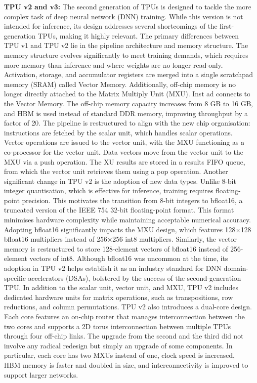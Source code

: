 \textbf{TPU v2 and v3:} The second generation of TPUs \cite{Norrie2021} is designed to tackle the more complex task of deep neural network (DNN) training. While this version is not intended for inference, its design addresses several shortcomings of the first-generation TPUs, making it highly relevant.
The primary differences between TPU v1 and TPU v2 lie in the pipeline architecture and memory structure. The memory structure evolves significantly to meet training demands, which requires more memory than inference and where weights are no longer read-only. Activation, storage, and accumulator registers are merged into a single scratchpad memory (SRAM) called Vector Memory. Additionally, off-chip memory is no longer directly attached to the Matrix Multiply Unit (MXU). Inst ad connects to the Vector Memory.
The off-chip memory capacity increases from 8 GB to 16 GB, and HBM is used instead of standard DDR memory, improving throughput by a factor of 20.
The pipeline is restructured to align with the new chip organisation: instructions are fetched by the scalar unit, which handles scalar operations. Vector operations are issued to the vector unit, with the MXU functioning as a co-processor for the vector unit. Data vectors move from the vector unit to the MXU via a push operation. The  XU results are stored in a results FIFO queue, from which the vector unit retrieves them using a pop operation.
Another significant change in TPU v2 is the adoption of new data types. Unlike 8-bit integer quantisation, which is effective for inference, training requires floating-point precision. This motivates the transition from 8-bit integers to bfloat16, a truncated version of the IEEE 754 32-bit floating-point format. This format minimises hardware complexity while maintaining acceptable numerical accuracy.
Adopting bfloat16 significantly impacts the MXU design, which features 128×128 bfloat16 multipliers instead of 256×256 int8 multipliers. Similarly, the vector memory is restructured to store 128-element vectors of bfloat16 instead of 256-element vectors of int8. Although bfloat16 was uncommon at the time, its adoption in TPU v2 helps establish it as an industry standard for DNN domain-specific accelerators (DSAs), bolstered by the success of the second-generation TPU.
In addition to the scalar unit, vector unit, and MXU, TPU v2 includes dedicated hardware units for matrix operations, such as transpositions, row reductions, and column permutations.
TPU v2 also introduces a dual-core design. Each core features an on-chip router that manages interconnection between the two cores and supports a 2D torus interconnection between multiple TPUs through four off-chip links.
The upgrade from the second and the third did not involve any radical redesign but simply an upgrade of some components. In particular, each core has two MXUs instead of one, clock speed is increased,  HBM memory is faster and doubled in size, and interconnectivity is improved to support larger networks.

